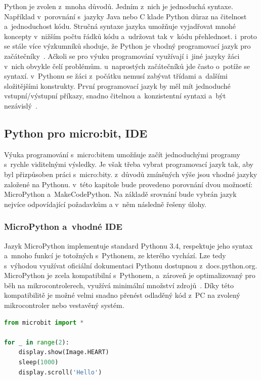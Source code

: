 \documentclass[
  digital,     %
  oneside,     %
  nosansbold,  %
  colorbold, %
  lof,         %
  nolot,         %
]{fithesis4}
\begin{document}
Python je zvolen z~mnoha důvodů. Jedním z~nich je jednoduchá syntaxe. Například v~porovnání s~jazyky Java nebo C klade Python důraz na čitelnost a~jednoduchost kódu. Stručná syntaxe jazyka umožňuje vyjadřovat mnohé koncepty v~nižším počtu řádků kódu a~udržovat tak v~kódu přehlednost. i~proto se stále více výzkumníků shoduje, že Python  je vhodný programovací jazyk pro začátečníky~\cite{Wainer18, Narayanan19, Lo15}. Ačkoli se pro výuku programování využívají i~jiné jazyky žáci v~nich obvykle čelí problémům. u~naprostých začátečníků jde často o~potíže se syntaxí. v~Pythonu se žáci z~počátku nemusí zabývat třídami a~dalšími složitějšími konstrukty. První programovací jazyk by měl mít jednoduché vstupní/výstupní příkazy, snadno čitelnou a~konzistentní syntaxi a~být nezávislý~\cite{Lo15}.

\subsection{Python pro micro:bit, IDE}
Výuka programování s~micro:bitem umožňuje začít jednoduchými programy s~rychle viditelnými výsledky. Je však třeba vybrat programovací jazyk tak, aby byl přizpůsoben práci s~micro:bity. z~důvodů zmíněných výše jsou vhodné jazyky založené na Pythonu. v~této kapitole bude provedeno porovnání dvou možností: MicroPython a~MakeCodePython. Na základě srovnání bude vybrán jazyk nejvíce odpovídající požadavkům a v~něm následně řešeny úlohy.

\subsubsection{MicroPython a~vhodné IDE}
Jazyk MicroPython implementuje standard Pythonu 3.4, respektuje jeho syntax a~mnoho funkcí je totožných s~Pythonem, ze kterého vychází. Lze tedy s~výhodou využívat oficiální dokumentaci Pythonu dostupnou z~docs.python.org. MicroPython je zcela kompatibilní s~Pythonem, a~zároveň je optimalizovaný pro běh na mikrocontrolerech, využívá minimální množství zdrojů~\cite{microPython}. Díky této kompatibilitě je možné velmi snadno přenést odladěný kód z~PC na zvolený mikrocontroler nebo vestavěný systém.

\begin{footnotesize}
\begin{lstlisting}[language=Python, caption={MicroPython ukázka}, label={ukazkaMicroPython}]
from microbit import *

for _ in range(2):
    display.show(Image.HEART)
    sleep(1000)
    display.scroll('Hello')
\end{lstlisting}
\end{footnotesize}
\end{document}
